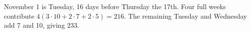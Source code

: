 November 1 is Tuesday, 16 days before Thursday the 17th. Four full weeks contribute $4(3\cdot10+2\cdot7+2\cdot5)=216$. The remaining Tuesday and Wednesday add 7 and 10, giving $\boxed{233}$.
